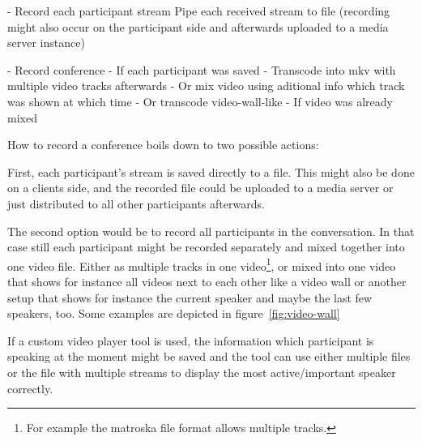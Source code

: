 \documentclass[../../../thesis.tex]{subfiles}
\begin{document}
\comment
	- Record each participant stream
		Pipe each received stream to file
		(recording might also occur on the participant side and afterwards uploaded to a media server instance)
			
	- Record conference
		- If each participant was saved
			- Transcode into mkv with multiple video tracks afterwards
			- Or mix video using aditional info
				which track was shown at which time
			- Or transcode video-wall-like
		- If video was already mixed
\endcomment


How to record a conference boils down to two possible actions:\par
First, each participant's stream is saved directly to a file. This might also be done on a clients side, and the recorded file could be uploaded to a media server or just distributed to all other participants afterwards.\par
The second option would be to record all participants in the conversation. In that case still each participant might be recorded separately and mixed together into one video file. Either as multiple tracks in one video\footnote{For example the matroska file format\cite{mkv-container} allows multiple tracks.}, or mixed into one video that shows for instance all videos next to each other like a video wall or another setup that shows for instance the current speaker and maybe the last few speakers, too. Some examples are depicted in figure~\ref{fig:video-wall}\\


If a custom video player tool is used, the information which participant is speaking at the moment might be saved and the tool can use either multiple files or the file with multiple streams to display the most active/important speaker correctly.\\
\end{document}
